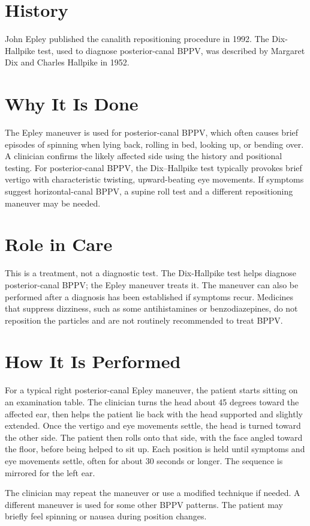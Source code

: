 \section*{History}
John Epley published the canalith repositioning procedure in 1992. The Dix-Hallpike test, used to diagnose posterior-canal BPPV, was described by Margaret Dix and Charles Hallpike in 1952.

\section*{Why It Is Done}
The Epley maneuver is used for posterior-canal BPPV, which often causes brief episodes of spinning when lying back, rolling in bed, looking up, or bending over. A clinician confirms the likely affected side using the history and positional testing. For posterior-canal BPPV, the Dix--Hallpike test typically provokes brief vertigo with characteristic twisting, upward-beating eye movements. If symptoms suggest horizontal-canal BPPV, a supine roll test and a different repositioning maneuver may be needed.

\section*{Role in Care}
This is a treatment, not a diagnostic test. The Dix-Hallpike test helps diagnose posterior-canal BPPV; the Epley maneuver treats it. The maneuver can also be performed after a diagnosis has been established if symptoms recur. Medicines that suppress dizziness, such as some antihistamines or benzodiazepines, do not reposition the particles and are not routinely recommended to treat BPPV.

\section*{How It Is Performed}
For a typical right posterior-canal Epley maneuver, the patient starts sitting on an examination table. The clinician turns the head about 45 degrees toward the affected ear, then helps the patient lie back with the head supported and slightly extended. Once the vertigo and eye movements settle, the head is turned toward the other side. The patient then rolls onto that side, with the face angled toward the floor, before being helped to sit up. Each position is held until symptoms and eye movements settle, often for about 30 seconds or longer. The sequence is mirrored for the left ear.

The clinician may repeat the maneuver or use a modified technique if needed. A different maneuver is used for some other BPPV patterns. The patient may briefly feel spinning or nausea during position changes.

